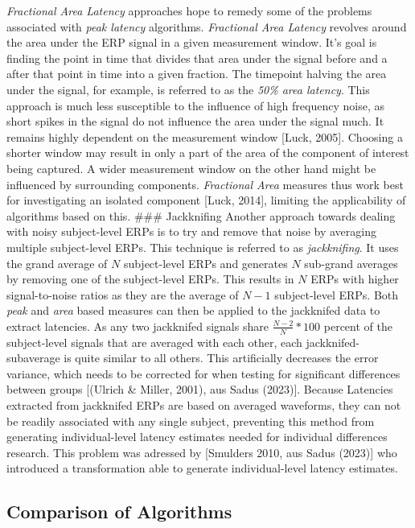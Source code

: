 \documentclass[
  man,floatsintext]{apa7}
\begin{document}
\emph{Fractional Area Latency} approaches hope to remedy some of the problems associated with \emph{peak latency} algorithms. \emph{Fractional Area Latency} revolves around the area under the ERP signal in a given measurement window. It's goal is finding the point in time that divides that area under the signal before and a after that point in time into a given fraction. The timepoint halving the area under the signal, for example, is referred to as the \emph{50\% area latency}. This approach is much less susceptible to the influence of high frequency noise, as short spikes in the signal do not influence the area under the signal much. It remains highly dependent on the measurement window {[}Luck, 2005{]}. Choosing a shorter window may result in only a part of the area of the component of interest being captured. A wider measurement window on the other hand might be influenced by surrounding components. \emph{Fractional Area} measures thus work best for investigating an isolated component {[}Luck, 2014{]}, limiting the applicability of algorithms based on this.
\#\#\# Jackknifing
Another approach towards dealing with noisy subject-level ERPs is to try and remove that noise by averaging multiple subject-level ERPs. This technique is referred to as \emph{jackknifing}. It uses the grand average of \(N\) subject-level ERPs and generates \(N\) sub-grand averages by removing one of the subject-level ERPs. This results in \(N\) ERPs with higher signal-to-noise ratios as they are the average of \(N-1\) subject-level ERPs. Both \emph{peak} and \emph{area} based measures can then be applied to the jackknifed data to extract latencies. As any two jackknifed signals share \(\frac{N-2}{N} * 100\) percent of the subject-level signals that are averaged with each other, each jackknifed-subaverage is quite similar to all others. This artificially decreases the error variance, which needs to be corrected for when testing for significant differences between groups {[}(Ulrich \& Miller, 2001), aus Sadus (2023){]}. Because Latencies extracted from jackknifed ERPs are based on averaged waveforms, they can not be readily associated with any single subject, preventing this method from generating individual-level latency estimates needed for individual differences research. This problem was adressed by {[}Smulders 2010, aus Sadus (2023){]} who introduced a transformation able to generate individual-level latency estimates.

\hypertarget{comparison-of-algorithms}{%
\subsection{Comparison of Algorithms}\label{comparison-of-algorithms}}
\end{document}
